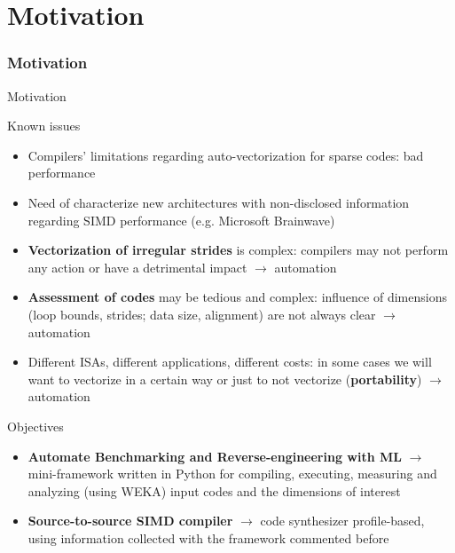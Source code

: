 \documentclass[xcolor=table,hideothersubsections,aspectratio=1610]{beamer}
\begin{document}
\section{Motivation}
\frametitle{Motivation}
\begin{frame}{Motivation}
    \begin{block}{Known issues}
        \begin{itemize}
            \item Compilers' limitations regarding auto-vectorization for sparse codes: bad performance
            \item Need of characterize new architectures with non-disclosed information regarding SIMD performance (e.g. Microsoft Brainwave)
        \end{itemize}

    \end{block}
    \begin{itemize}
        \item \textbf{Vectorization of irregular strides} is complex: compilers may not perform any action or have a detrimental impact $\rightarrow$ automation

        \item \textbf{Assessment of codes} may be tedious and complex: influence of dimensions (loop bounds, strides; data size, alignment) are not always clear $\rightarrow$ automation
        \item Different ISAs, different applications, different costs: in some cases we will want to vectorize in a certain way or just to not vectorize (\textbf{portability}) $\rightarrow$ automation
    \end{itemize}
\end{frame}

\begin{frame}{Objectives}
    \begin{itemize}
        \item \textbf{Automate Benchmarking and Reverse-engineering with ML} $\rightarrow$ mini-framework written in Python for compiling, executing, measuring and analyzing (using WEKA) input codes and the dimensions of interest
        \item \textbf{Source-to-source SIMD compiler} $\rightarrow$ code synthesizer profile-based, using information collected with the framework commented before
    \end{itemize}
\end{frame}
\end{document}
